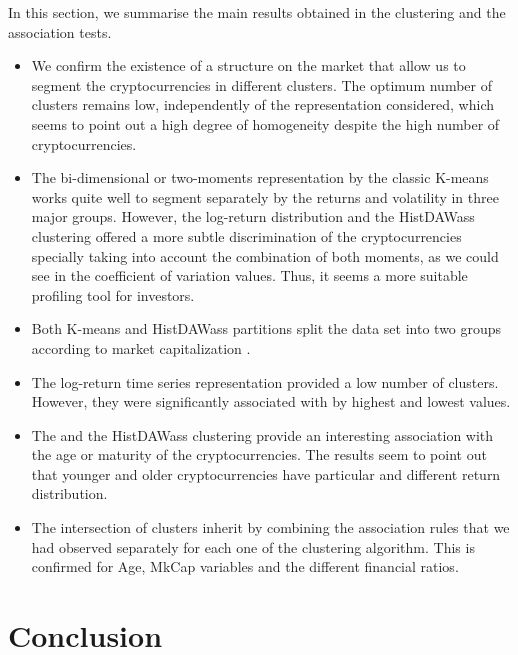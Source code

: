 \documentclass{bmcart}
\begin{document}
In this section, we summarise the main results obtained in the clustering and the association tests. 
\begin{itemize}
	\item We confirm the existence of a structure on the market that allow us to segment the cryptocurrencies in different clusters. The optimum number of  clusters remains low, independently of the representation considered, which seems to point out a high degree of homogeneity despite the high number of cryptocurrencies.
	\item The bi-dimensional or two-moments representation by the classic K-means works quite well to segment separately by the returns and volatility in three major groups. However, the log-return distribution and the HistDAWass clustering offered a more subtle discrimination of the cryptocurrencies specially taking into account the combination of both moments, as we could see in the coefficient of variation values. Thus, it seems a more suitable profiling tool for investors. 
	\item Both K-means and HistDAWass partitions split the data set into two groups according to market capitalization .
	\item The log-return time series representation provided a low number of clusters. However, they were significantly associated with   by highest and lowest values.  
	\item The    and the HistDAWass clustering provide an interesting association with the age or maturity of the cryptocurrencies. The results seem to point out that younger and older cryptocurrencies have particular and different return distribution. 
	\item The intersection of clusters inherit by combining the association rules that we had observed separately for each one of the clustering algorithm. This is confirmed for Age, MkCap variables and the different financial ratios. 
\end{itemize}

\section*{Conclusion}
\end{document}

